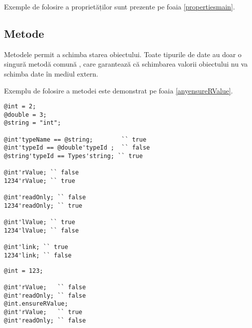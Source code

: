 Exemple de folosire a proprietăților sunt prezente pe foaia \ref{propertiesmain}.

\subsection{Metode}

Metodele permit a schimba starea obiectului. Toate tipurile de date au doar o singură metodă comună , care garantează că schimbarea valorii obiectului nu va schimba date în mediul extern.

Exemplu de folosire a metodei  este demonstrat pe foaia \ref{anyensureRValue}.

\newpage
\begin{lstlisting}[caption=Proprietăți, label=propertiesmain]
@int = 2;
@double = 3;
@string = "int";

@int'typeName == @string;		 `` true
@int'typeId == @double'typeId ;	 `` false
@string'typeId == Types'string; `` true

@int'rValue; `` false
1234'rValue; `` true

@int'readOnly; `` false
1234'readOnly; `` true

@int'lValue; `` true
1234'lValue; `` false

@int'link; `` true
1234'link; `` false
\end{lstlisting}


\begin{lstlisting}[caption=Metoda any.ensureRValue, label=anyensureRValue]
@int = 123;

@int'rValue;   `` false
@int'readOnly; `` false
@int.ensureRValue;
@int'rValue;   `` true
@int'readOnly; `` false
\end{lstlisting}